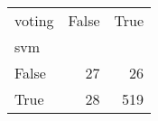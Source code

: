 \begin{tabular}{lrr}
\toprule
voting &  False &  True  \\
svm   &        &        \\
\midrule
False &     27 &     26 \\
True  &     28 &    519 \\
\bottomrule
\end{tabular}

